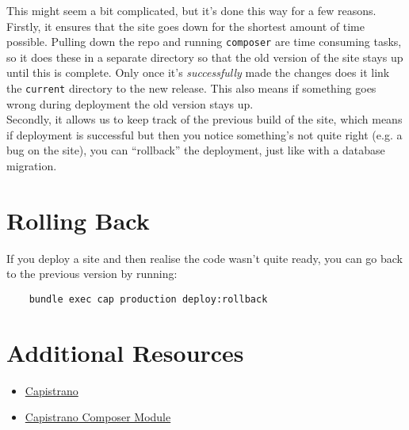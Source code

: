 This might seem a bit complicated, but it's done this way for a few reasons.
\\

Firstly, it ensures that the site goes down for the shortest amount of time possible. Pulling down the repo and running \texttt{composer} are time consuming tasks, so it does these in a separate directory so that the old version of the site stays up until this is complete. Only once it's \textit{successfully} made the changes does it link the \texttt{current} directory to the new release. This also means if something goes wrong during deployment the old version stays up.
\\

Secondly, it allows us to keep track of the previous build of the site, which means if deployment is successful but then you notice something's not quite right (e.g. a bug on the site), you can ``rollback'' the deployment, just like with a database migration.


\section{Rolling Back}

If you deploy a site and then realise the code wasn't quite ready, you can go back to the previous version by running:

\begin{verbatim}
    bundle exec cap production deploy:rollback
\end{verbatim}


\section{Additional Resources}

\begin{itemize}[leftmargin=*]
    \item \href{https://capistranorb.com}{Capistrano}
    \item \href{https://github.com/capistrano/composer}{Capistrano Composer Module}
\end{itemize}
